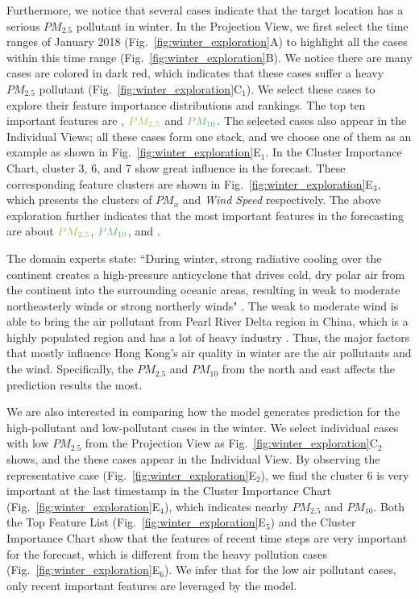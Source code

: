 Furthermore, we notice that several cases indicate that the target location has a serious $PM_{2.5}$ pollutant in winter. 
In the Projection View, we first select the time ranges of January 2018 (Fig.~\ref{fig:winter_exploration}A) to highlight all the cases within this time range (Fig.~\ref{fig:winter_exploration}B). 
We notice there are many cases are colored in dark red, which indicates that these cases suffer a heavy $PM_{2.5}$ pollutant (Fig.~\ref{fig:winter_exploration}C$_1$).
We select these cases to explore their feature importance distributions and rankings.
The top ten important features are \textit{\color{WINDColor}{Wind Speed}}, $\color{PM25Color}{PM_{2.5}}$ and $\color{PM10Color}{PM_{10}}$.
The selected cases also appear in the Individual Views; all these cases form one stack, and we choose one of them as an example as shown in Fig.~\ref{fig:winter_exploration}E$_1$. 
In the Cluster Importance Chart, cluster 3, 6, and 7 show great influence in the forecast. 
These corresponding feature clusters are shown in Fig.~\ref{fig:winter_exploration}E$_3$, which presents the clusters of $PM_x$ and \textit{Wind Speed} respectively. 
The above exploration further indicates that the most important features in the forecasting are about $\color{PM25Color}{PM_{2.5}}$, $\color{PM10Color}{PM_{10}}$, and \textit{\color{WINDColor}{Wind Speed}}. 

The domain experts state: ``During winter, strong radiative cooling over the continent creates a high-pressure anticyclone that drives cold, dry polar air from the continent into the surrounding oceanic areas, resulting in weak to moderate northeasterly winds or strong northerly winds" \cite{louie2005seasonal, murakami1979winter}. 
The weak to moderate wind is able to bring the air pollutant from Pearl River Delta region in China, which is a highly populated region and has a lot of heavy industry \cite{cao2003characteristics}.
Thus, the major factors that mostly influence Hong Kong's air quality in winter are the air pollutants and the wind.
Specifically, the $PM_{2.5}$ and $PM_{10}$ from the north and east affects the prediction results the most. 

We are also interested in comparing how the model generates prediction for the high-pollutant and low-pollutant cases in the winter. 
We select individual cases with low $PM_{2.5}$ from the Projection View as Fig.~\ref{fig:winter_exploration}C$_2$ shows, and the these cases appear in the Individual View. 
By observing the representative case (Fig.~\ref{fig:winter_exploration}E$_2$), we find the cluster 6 is very important at the last timestamp in the Cluster Importance Chart (Fig.~\ref{fig:winter_exploration}E$_4$), which indicates nearby $PM_{2.5}$ and $PM_{10}$. 
Both the Top Feature List (Fig.~\ref{fig:winter_exploration}E$_5$) and the Cluster Importance Chart show that the features of recent time steps are very important for the forecast, which is different from the heavy pollution cases (Fig.~\ref{fig:winter_exploration}E$_6$). 
We infer that for the low air pollutant cases, only recent important features are leveraged by the model. 

